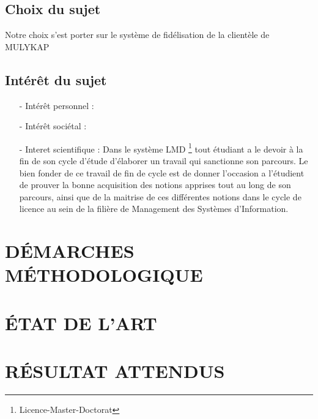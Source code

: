         \subsection[Choix du sujet]{Choix du sujet}
        Notre choix s’est porter sur le système de fidélisation de la clientèle
        de MULYKAP
        \subsection[Interet du sujet]{Intérêt du sujet}
            \begin{itemize}
                \item [-] Intérêt personnel :
                \newline
            
                \item [-] Intérêt sociétal :
                \newline
            
                \item [-] Interet scientifique : Dans le système LMD \footnote[1]{Licence-Master-Doctorat} tout étudiant
                a le devoir à la fin de son cycle d’étude d’élaborer un travail qui
                sanctionne son parcours. Le bien fonder de ce travail de fin de cycle
                est de donner l’occasion a l’étudient de prouver la bonne acquisition
                des notions apprises tout au long de son parcours, ainsi que de la maitrise
                de ces différentes notions dans le cycle de licence au sein de la filière de Management
                des Systèmes d’Information.    
            \end{itemize}
        
    \section[Démarches méthodologiques]{DÉMARCHES MÉTHODOLOGIQUE}

    \section[Etat de l'art]{ÉTAT DE L’ART}

    \section[Résultats attenus]{RÉSULTAT ATTENDUS}


